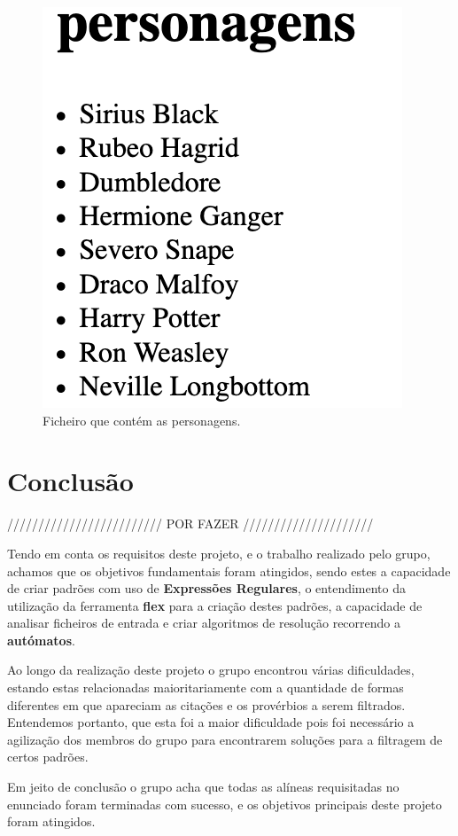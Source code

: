 \documentclass[11pt,a4paper]{report}
\begin{document}
\begin{figure}[H]
\centering
\includegraphics[scale=0.6]{personagens_resultado.png}
\caption{Ficheiro que contém as personagens.}
\label{img:personagens_resultados}
\end{figure}


\chapter{Conclusão}
\label{chap:concl}

///////////////////////// POR FAZER /////////////////////

Tendo em conta os requisitos deste projeto, e o trabalho realizado pelo grupo, achamos que os objetivos fundamentais foram atingidos, sendo estes a capacidade de criar padrões com uso de \textbf{Expressões Regulares}, o entendimento da utilização da ferramenta \textbf{flex} para a criação destes padrões, a capacidade de analisar ficheiros de entrada e criar algoritmos de resolução recorrendo a \textbf{autómatos}.

Ao longo da realização deste projeto o grupo encontrou várias dificuldades, estando estas relacionadas maioritariamente com a quantidade de formas diferentes em que apareciam as citações e os provérbios a serem filtrados. Entendemos portanto, que esta foi a maior dificuldade pois foi necessário a agilização dos membros do grupo para encontrarem soluções para a filtragem de certos padrões.

Em jeito de conclusão o grupo acha que todas as alíneas requisitadas no enunciado foram terminadas com sucesso, e os objetivos principais deste projeto foram atingidos.
\end{document}
